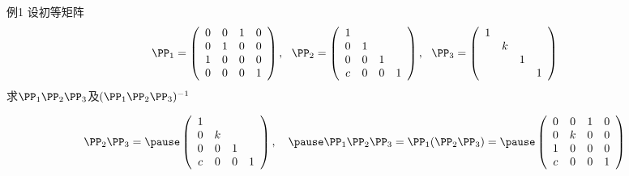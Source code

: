 \begin{frame}
  \begin{footnotesize}  
    \begin{exampleblock}{例1}
      设初等矩阵
      $$
      \PP_1 = \left(
      \begin{array}{cccc}
        0&0&1&0 \\
        0&1&0&0 \\
        1&0&0&0 \\
        0&0&0&1
      \end{array}
      \right), ~~
      \PP_2 = \left(
      \begin{array}{cccc}
        1& & &  \\
        0&1& &  \\
        0&0&1& \\
        c&0&0&1
      \end{array}
      \right), ~~
      \PP_3 = \left(
      \begin{array}{cccc}
        1& & &  \\
        &k& &  \\
        & &1& \\
        & & &1
      \end{array}
      \right)
      $$
      求$\PP_1\PP_2\PP_3$及$(\PP_1\PP_2\PP_3)^{-1}$
    \end{exampleblock}
    \pause 
    \jiename
    
    $$
    \PP_2\PP_3 =  \pause  \left(
    \begin{array}{cccc}
      1& & &  \\
      0&k& &  \\
      0&0&1& \\
      c&0&0&1
    \end{array}
    \right), \quad  \pause 
    \PP_1\PP_2\PP_3=\PP_1(\PP_2\PP_3) =\pause\left(
    \begin{array}{cccc}
      0&0&1&0 \\
      0&k&0&0  \\
      1&0&0&0  \\
      c&0&0&1
    \end{array}
    \right)
    $$



  \end{footnotesize}
\end{frame}


